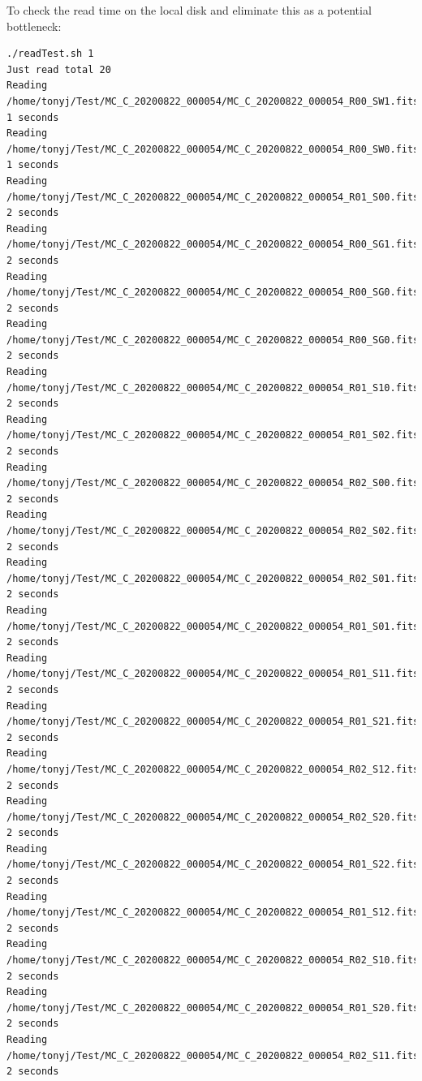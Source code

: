 To check the read time on the local disk  and eliminate this as a potential bottleneck:
\begin{verbatim}
./readTest.sh 1
Just read total 20
Reading /home/tonyj/Test/MC_C_20200822_000054/MC_C_20200822_000054_R00_SW1.fits 1 seconds
Reading /home/tonyj/Test/MC_C_20200822_000054/MC_C_20200822_000054_R00_SW0.fits 1 seconds
Reading /home/tonyj/Test/MC_C_20200822_000054/MC_C_20200822_000054_R01_S00.fits 2 seconds
Reading /home/tonyj/Test/MC_C_20200822_000054/MC_C_20200822_000054_R00_SG1.fits 2 seconds
Reading /home/tonyj/Test/MC_C_20200822_000054/MC_C_20200822_000054_R00_SG0.fits 2 seconds
Reading /home/tonyj/Test/MC_C_20200822_000054/MC_C_20200822_000054_R00_SG0.fits 2 seconds
Reading /home/tonyj/Test/MC_C_20200822_000054/MC_C_20200822_000054_R01_S10.fits 2 seconds
Reading /home/tonyj/Test/MC_C_20200822_000054/MC_C_20200822_000054_R01_S02.fits 2 seconds
Reading /home/tonyj/Test/MC_C_20200822_000054/MC_C_20200822_000054_R02_S00.fits 2 seconds
Reading /home/tonyj/Test/MC_C_20200822_000054/MC_C_20200822_000054_R02_S02.fits 2 seconds
Reading /home/tonyj/Test/MC_C_20200822_000054/MC_C_20200822_000054_R02_S01.fits 2 seconds
Reading /home/tonyj/Test/MC_C_20200822_000054/MC_C_20200822_000054_R01_S01.fits 2 seconds
Reading /home/tonyj/Test/MC_C_20200822_000054/MC_C_20200822_000054_R01_S11.fits 2 seconds
Reading /home/tonyj/Test/MC_C_20200822_000054/MC_C_20200822_000054_R01_S21.fits 2 seconds
Reading /home/tonyj/Test/MC_C_20200822_000054/MC_C_20200822_000054_R02_S12.fits 2 seconds
Reading /home/tonyj/Test/MC_C_20200822_000054/MC_C_20200822_000054_R02_S20.fits 2 seconds
Reading /home/tonyj/Test/MC_C_20200822_000054/MC_C_20200822_000054_R01_S22.fits 2 seconds
Reading /home/tonyj/Test/MC_C_20200822_000054/MC_C_20200822_000054_R01_S12.fits 2 seconds
Reading /home/tonyj/Test/MC_C_20200822_000054/MC_C_20200822_000054_R02_S10.fits 2 seconds
Reading /home/tonyj/Test/MC_C_20200822_000054/MC_C_20200822_000054_R01_S20.fits 2 seconds
Reading /home/tonyj/Test/MC_C_20200822_000054/MC_C_20200822_000054_R02_S11.fits 2 seconds

\end{verbatim}


